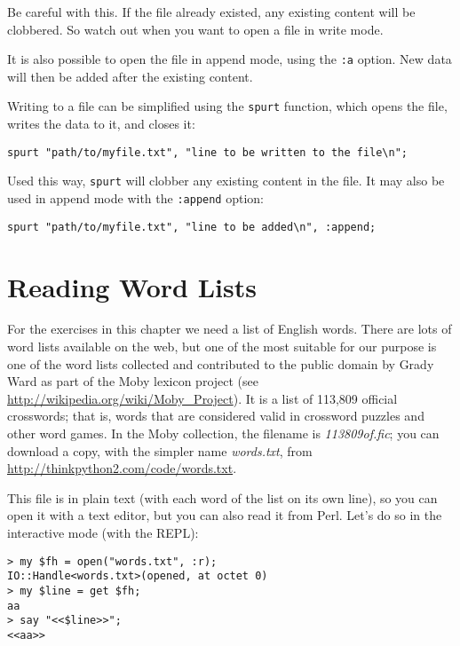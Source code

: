 Be careful with this. If the file already existed, any 
existing content will be clobbered. So watch out when 
you want to open a file in write mode.

It is also possible to open the file in append mode, using the 
{\tt :a} option. New data will then be added after the existing 
content.

Writing to a file can be simplified using the {\tt spurt} 
function, which opens the file, writes the data to it, 
and closes it:

\begin{verbatim}
spurt "path/to/myfile.txt", "line to be written to the file\n";
\end{verbatim}

Used this way, {\tt spurt} will clobber any existing content in 
the file. It may also be used in append mode with the {\tt :append} 
option:

\begin{verbatim}
spurt "path/to/myfile.txt", "line to be added\n", :append;
\end{verbatim}


\section{Reading Word Lists}
\label{wordlist}

For the exercises in this chapter we need a list of English 
words. There are lots of word lists available on the web, 
but one of the most suitable for our purpose is one of the 
word lists collected and contributed to the public domain 
by Grady Ward as part of the Moby lexicon project (see 
\url{http://wikipedia.org/wiki/Moby_Project}).  It is a 
list of 113,809 official crosswords; that is, words that are
considered valid in crossword puzzles and other word games.  
In the Moby collection, the filename is \emph{113809of.fic}; 
you can download a copy, with the simpler name \emph{words.txt}, 
from \url{http://thinkpython2.com/code/words.txt}.

This file is in plain text (with each word of the list on 
its own line), so you can open it with a text
editor, but you can also read it from Perl. Let's do so 
in the interactive mode (with the REPL):

\begin{verbatim}
> my $fh = open("words.txt", :r);
IO::Handle<words.txt>(opened, at octet 0)
> my $line = get $fh;
aa
> say "<<$line>>";
<<aa>>
\end{verbatim}

